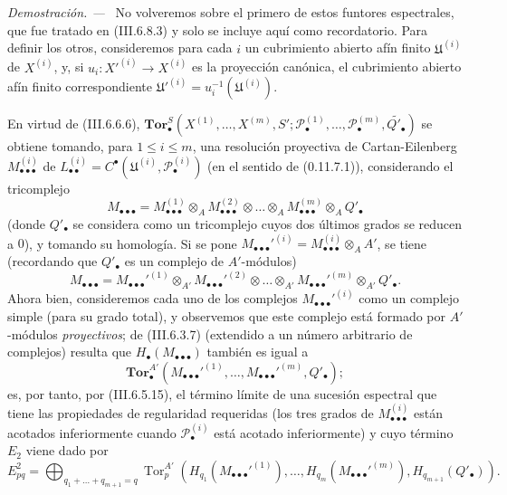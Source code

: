 \documentclass[10pt,oneside]{book}
\newcommand{\sref}[2][]{\textup{(#2)}}
\newenvironment{proof}{\par\medskip\noindent\textit{Demostración. ---\ }}{\par}
\begin{document}
\begin{proof}
No volveremos sobre el primero de estos funtores espectrales, que fue tratado
en \sref{III.6.8.3} y solo se incluye aquí como recordatorio. Para definir
los otros, consideremos para cada $i$ un cubrimiento abierto afín finito
$\mathfrak U^{(i)}$ de $X^{(i)}$, y, si
$u_i:X'^{(i)}\to X^{(i)}$ es la proyección canónica, el cubrimiento abierto
afín finito correspondiente
$\mathfrak U'^{(i)}=u_i^{-1}(\mathfrak U^{(i)})$.

En virtud de \sref{III.6.6.6},
$\mathbf{Tor}_\bullet^S(X^{(1)},\ldots,X^{(m)},S';
\mathscr P_\bullet^{(1)},\ldots,\mathscr P_\bullet^{(m)},
\widetilde{Q'_\bullet})$ se obtiene tomando, para $1\leq i\leq m$, una
resolución proyectiva de Cartan-Eilenberg
$M_{\bullet\bullet\bullet}^{(i)}$ de
$L_{\bullet\bullet}^{(i)}=C^\bullet(\mathfrak U^{(i)},
\mathscr P_\bullet^{(i)})$ (en el sentido de \sref[0]{0.11.7.1}),
considerando el tricomplejo
\[
  M_{\bullet\bullet\bullet}
  =M_{\bullet\bullet\bullet}^{(1)}\otimes_A
   M_{\bullet\bullet\bullet}^{(2)}\otimes\ldots\otimes_A
   M_{\bullet\bullet\bullet}^{(m)}\otimes_A Q'_\bullet
\]
(donde $Q'_\bullet$ se considera como un tricomplejo cuyos dos últimos
grados se reducen a $0$), y tomando su homología. Si se pone
$M_{\bullet\bullet\bullet}'^{(i)}=
M_{\bullet\bullet\bullet}^{(i)}\otimes_A A'$, se tiene (recordando que
$Q'_\bullet$ es un complejo de $A'$-módulos)
\[
  M_{\bullet\bullet\bullet}
  =M_{\bullet\bullet\bullet}'^{(1)}\otimes_{A'}
   M_{\bullet\bullet\bullet}'^{(2)}\otimes\ldots\otimes_{A'}
   M_{\bullet\bullet\bullet}'^{(m)}\otimes_{A'} Q'_\bullet.
\]
Ahora bien, consideremos cada uno de los complejos
$M_{\bullet\bullet\bullet}'^{(i)}$ como un complejo simple (para su grado
total), y observemos que este complejo está formado por $A'$-módulos
\emph{proyectivos}; de \sref{III.6.3.7} (extendido a un número arbitrario de
complejos) resulta que $H_\bullet(M_{\bullet\bullet\bullet})$ también es
igual a
\[
  \mathbf{Tor}_\bullet^{A'}
  (M_{\bullet\bullet\bullet}'^{(1)},\ldots,
   M_{\bullet\bullet\bullet}'^{(m)},Q'_\bullet);
\]
es, por tanto, por \sref{III.6.5.15}, el término límite de una sucesión
espectral que tiene las propiedades de regularidad requeridas (los tres
grados de $M_{\bullet\bullet\bullet}^{(i)}$ están acotados inferiormente
cuando $\mathscr P_\bullet^{(i)}$ está acotado inferiormente) y cuyo término
$E_2$ viene dado por
\[
  E_{pq}^2
  =\bigoplus_{q_1+\ldots+q_{m+1}=q}
  \operatorname{Tor}_p^{A'}
  (H_{q_1}(M_{\bullet\bullet\bullet}'^{(1)}),\ldots,
   H_{q_m}(M_{\bullet\bullet\bullet}'^{(m)}),H_{q_{m+1}}(Q'_\bullet)).
\]


\end{proof}
\end{document}
